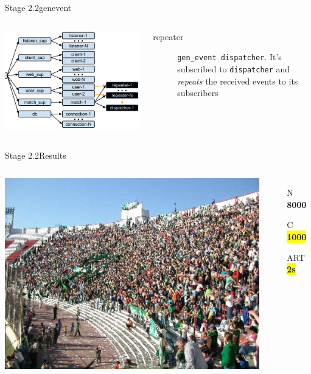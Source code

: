 \documentclass[utf8,hyperref={colorlinks=true}]{beamer}
\begin{document}
\begin{frame}{Stage 2.2}{gen\textunderscore event}
	\begin{columns}
			\begin{center}
				\includegraphics[height=.75\textheight]{img/architecture-3-2.png}
			\end{center}
			\begin{description}
				\item[repeater]
					\texttt{gen\_event dispatcher}. It's subscribed to \texttt{dispatcher} and \emph{repeats} the received events to its subscribers
			\end{description}
	\end{columns}
\end{frame}
\begin{frame}{Stage 2.2}{Results}
	\begin{columns}
		\column{.66\textwidth}
			\includegraphics[top=-1,width=\textwidth]{img/results-3-2.jpg}
		\column{.33\textwidth}
			\begin{itemize}
				\item[N] \textbf{\Large 8000}
				\item[C] \textbf{\colorbox{yellow}{\Large 1000}}
				\item[ART] \textbf{\colorbox{yellow}{\Large 2s}}
			\end{itemize}
	\end{columns}
\end{frame}
\end{document}
